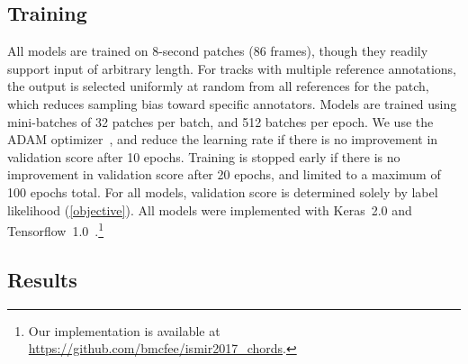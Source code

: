 \documentclass{article}
\begin{document}
\subsection{Training}
All models are trained on 8-second patches (86 frames), though they readily support input of arbitrary length.
For tracks with multiple reference annotations, the output is selected uniformly at random from all references for the patch, which reduces sampling bias toward specific annotators.
Models are trained using mini-batches of 32 patches per batch, and 512 batches per epoch.
We use the ADAM optimizer~\cite{kingma2014adam}, and reduce the learning rate if there is no improvement in validation score after 10 epochs.
Training is stopped early if there is no improvement in validation score after 20 epochs, and limited to a maximum of 100 epochs total.
For all models, validation score is determined solely by label likelihood (\cref{objective}).
All models were implemented with Keras~2.0 and Tensorflow~1.0~\cite{chollet2015keras, tensorflow2015-whitepaper}.\footnote{Our implementation is available at \url{https://github.com/bmcfee/ismir2017_chords}.}

\subsection{Results}
\end{document}
